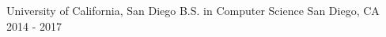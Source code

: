 

\begin{cventries}

  \cventry
    {University of California, San Diego} %
    {B.S. in Computer Science} %
    {San Diego, CA} %
    {2014 - 2017} %
    {
    }

\end{cventries}
